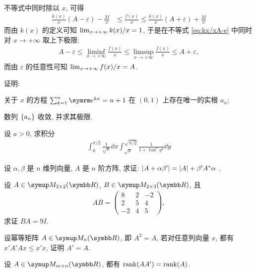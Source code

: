 \begin{exercise}[series=exer]
\begin{answer}
\begin{align*}
        \end{align*}
        不等式中同时除以 $ x $, 可得
        \begin{align}\label{eq:kx/xA-e}
            \frac{k(x)}{x}(A - \varepsilon) - \frac{M}{x} & \le \frac{f(x)}{x} \le \frac{k(x)}{x}(A + \varepsilon) + \frac{M}{x}
        \end{align}
        而由 $ k(x) $ 的定义可知 $ \lim_{x \to +\infty}k(x)/x = 1 $, 于是在不等式 \eqref{eq:kx/xA-e} 中同时对 $ x \to +\infty $ 取上下极限:
        \begin{align*}
            A - \varepsilon \le \liminf_{x \to +\infty} \frac{f(x)}{x} \le \limsup_{x \to +\infty} \frac{f(x)}{x} \le A + \varepsilon,
        \end{align*}
        而由 $ \varepsilon $ 的任意性可知 $ \lim_{x \to +\infty} f(x)/x = A $.
    \end{answer}
    \item 证明: \begin{exercise}
        \item 关于 $ x $ 的方程 $ \sum_{k=1}^{n} \me^{kx} = n + 1 $ 在 $ (0, 1) $ 上存在唯一的实根 $ a_{n} $;
        \item 数列 $ \qty{a_{n}} $ 收敛, 并求其极限.
    \end{exercise}
    \item 设 $ a > 0 $, 求积分
    \begin{align*}
        \int_{0}^{\pi/2} \frac{1}{\sqrt{x}} \dd{x} \int_{\sqrt{x}}^{\sqrt{\pi/2}} \frac{1}{1 + \tan^{a}y^{2}} \dd{y}
    \end{align*}
    \item 设 $ \alpha, \beta $ 是 $ n $ 维列向量, $ A $ 是 $ n $ 阶方阵, 求证: $ \abs{A + \alpha\beta'} = \abs{A} + \beta'A^{*}\alpha $ . 
    \item 设 $ A \in \MM[\R][3\times 2] $, $ B \in \MM[\R][2 \times 3] $, 且
    \begin{align*}
        AB = \begin{pmatrix}
            8 & 2 & -2 \\
            2 & 5 & 4 \\
            -2 & 4 & 5
        \end{pmatrix},
    \end{align*}
    求证 $ BA = 9 I $. 
    \item 设幂等矩阵 $ A \in \MM $, 即 $ A^{2} = A $, 若对任意列向量 $ x $, 都有 $ x'A'Ax \le x'x $, 证明 $ A' = A $.    
    \item 设 $ A \in \MM[\R][m \times n] $, 都有 $ \rank(AA') = \rank(A) $.  

\end{exercise}
